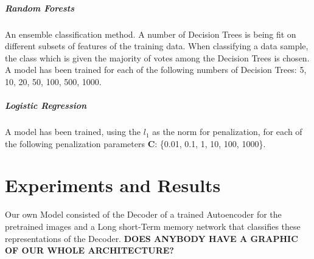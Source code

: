 \documentclass{article}
\begin{document}
\subparagraph{Random Forests}
An ensemble classification method. A number of Decision Trees is being fit on different subsets of features of the training data. When classifying a data sample, the class which is given the majority of votes among the Decision Trees is chosen. A model has been trained for each of the following numbers of Decision Trees: 5, 10, 20, 50, 100, 500, 1000.

\subparagraph{Logistic Regression}
A model has been trained, using the $l_1$ as the norm for penalization, for each of the following penalization parameters \textbf{C}: \{0.01, 0.1, 1, 10, 100, 1000\}.

\section{Experiments and Results}
Our own Model consisted of the Decoder of a trained Autoencoder for the pretrained images and a Long short-Term memory\cite{LSTM} network that classifies these representations of the Decoder. \textbf{DOES ANYBODY HAVE A GRAPHIC OF OUR WHOLE ARCHITECTURE?}
\end{document}
